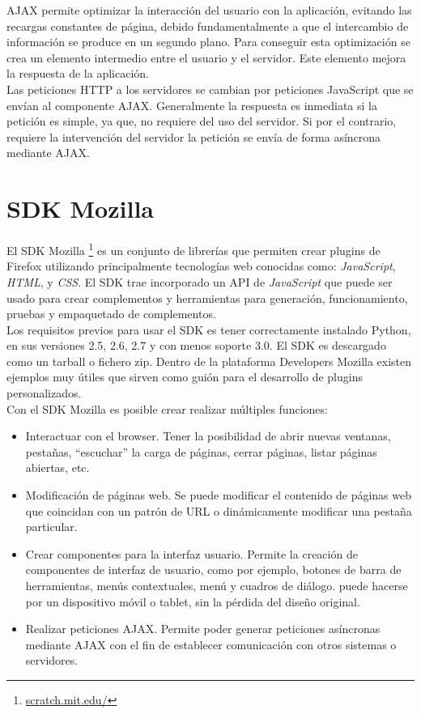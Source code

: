 \documentclass[a4paper, 12pt]{book}
\begin{document}
AJAX permite optimizar la interacción del usuario con la aplicación, evitando las recargas
constantes de página, debido fundamentalmente a que el intercambio de información se 
produce en un segundo plano. Para conseguir esta optimización se crea un elemento intermedio
entre el usuario y el servidor. Este elemento mejora la respuesta de la aplicación. \\

Las peticiones HTTP a los servidores se cambian por peticiones JavaScript que se envían al 
componente AJAX. Generalmente la respuesta es inmediata si la petición es simple, ya que, 
no requiere del uso del servidor. Si por el contrario, requiere la intervención del servidor
la petición se envía de forma asíncrona mediante AJAX.


\section{SDK Mozilla}
\label{sec:seccion8}

El SDK Mozilla \footnote{\url{scratch.mit.edu/}} es un conjunto de librerías que permiten crear 
plugins de Firefox utilizando principalmente tecnologías web conocidas como: \emph{JavaScript}, 
\emph{HTML}, y \emph{CSS}. El SDK trae incorporado un API de \emph{JavaScript} que puede ser 
usado para crear complementos y herramientas para generación, funcionamiento, pruebas y
empaquetado de complementos.  \\

Los requisitos previos para usar el SDK es tener correctamente instalado Python, en sus versiones
2.5, 2.6, 2.7 y con menos soporte 3.0. El SDK es descargado como un tarball o fichero zip. 
Dentro de la plataforma Developers Mozilla existen ejemplos muy útiles que sirven como guión para
el desarrollo de plugins personalizados. \\

Con el SDK Mozilla es posible crear realizar múltiples funciones:

\begin{itemize}
  \item Interactuar con el browser. Tener la posibilidad de abrir nuevas ventanas, pestañas, "`escuchar"' la
	carga de páginas, cerrar páginas, listar páginas abiertas, etc.
  \item Modificación de páginas web. Se puede modificar el contenido de páginas web que coincidan con un patrón
	de URL o dinámicamente modificar una pestaña particular.
  \item Crear componentes para la interfaz usuario. Permite la creación de componentes de interfaz de usuario, como
	por ejemplo, botones de barra de herramientas, menús contextuales, menú y cuadros de diálogo.
	puede hacerse por un dispositivo móvil o tablet, sin la pérdida del diseño original. 
	\item Realizar peticiones AJAX. Permite poder generar peticiones asíncronas mediante AJAX con el fin de establecer
	comunicación con otros sistemas o servidores.
\end{itemize}
\end{document}
